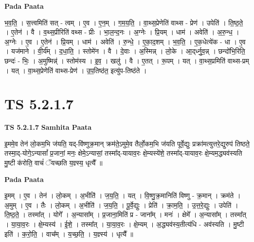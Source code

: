 \documentclass[17pt]{extarticle}
\begin{document}
\textbf{Pada Paata} \newline

भ॒व॒ति॒ । स॒त्त्वमिति॑ सत् - त्वम् । ए॒व । ए॒न॒म् । ग॒म॒य॒ति॒ । वा॒थ्स॒प्रेणेति॑ वाथ्स - प्रेण॑ । उपेति॑ । ति॒ष्ठ॒ते॒ । ए॒तेन॑ । वै । व॒थ्स॒प्रीरिति॑ वथ्स - प्रीः । भा॒ल॒न्द॒नः । अ॒ग्नेः । प्रि॒यम् । धाम॑ । अवेति॑ । अ॒रु॒न्ध॒ । अ॒ग्नेः । ए॒व । ए॒तेन॑ । प्रि॒यम् । धाम॑ । अवेति॑ । रु॒न्धे॒ । ए॒का॒द॒शम् । भ॒व॒ति॒ । ए॒क॒धेत्ये॑क - धा । ए॒व । यज॑माने । वी॒र्य᳚म् । द॒धा॒ति॒ । स्तोमे॑न । वै । दे॒वाः । अ॒स्मिन्न् । लो॒के । आ॒द्‌र्ध्नु॒व॒न्न् । छन्दो॑भि॒रिति॒ छन्दः॑ - भिः॒ । अ॒मुष्मिन्न्॑ । स्तोम॑स्य । इ॒व॒ । खलु॑ । वै । ए॒तत् । रू॒पम् । यत् । वा॒थ्स॒प्रमिति॑ वाथ्स-प्रम् । यत् । वा॒थ्स॒प्रेणेति॑ वाथ्स-प्रेण॑ । उ॒प॒तिष्ठ॑त॒ इत्यु॑प-तिष्ठ॑ते ।  \newline




\section*{ TS 5.2.1.7 }

\textbf{TS 5.2.1.7 } \newline
\textbf{Samhita Paata} \newline

इ॒ममे॒व तेन॑ लो॒कम॒भि ज॑यति॒ यद्-वि॑ष्णुक्र॒मान् क्रम॑ते॒ऽमुमे॒व तैर्लो॒कम॒भि ज॑यति पूर्वे॒द्युः प्रक्रा॑मत्युत्तरे॒द्युरुप॑ तिष्ठते॒ तस्मा॒द्-योगे॒ऽन्यासां᳚ प्र॒जानां॒ मनः॒ क्षेमे॒ऽन्यासां॒ तस्मा᳚द्-यायाव॒रः क्षे॒म्यस्ये॑शे॒ तस्मा᳚द्-यायाव॒रः क्षे॒म्यम॒द्ध्यव॑स्यति मु॒ष्टी क॑रोति॒ वाचं॑ ॅयच्छति य॒ज्ञ्स्य॒ धृत्यै᳚ ॥ \newline

\textbf{Pada Paata} \newline

इ॒मम् । ए॒व । तेन॑ । लो॒कम् । अ॒भीति॑ । ज॒य॒ति॒ । यत् । वि॒ष्णु॒क्र॒मानिति॑ विष्णु - क्र॒मान् । क्रम॑ते । अ॒मुम् । ए॒व । तैः । लो॒कम् । अ॒भीति॑ । ज॒य॒ति॒ । पू॒र्वे॒द्युः । प्रेति॑ । क्रा॒म॒ति॒ । उ॒त्त॒रे॒द्युः । उपेति॑ । ति॒ष्ठ॒ते॒ । तस्मा᳚त् । योगे᳚ । अ॒न्यासा᳚म् । प्र॒जाना॒मिति॑ प्र - जाना᳚म् । मनः॑ । क्षेमे᳚ । अ॒न्यासा᳚म् । तस्मा᳚त् । या॒या॒व॒रः । क्षे॒म्यस्य॑ । ई॒शे॒ । तस्मा᳚त् । या॒या॒व॒रः । क्षे॒म्यम् । अ॒द्ध्यव॑स्य॒तीत्य॑धि - अव॑स्यति । मु॒ष्टी इति॑ । क॒रो॒ति॒ । वाच᳚म् । य॒च्छ॒ति॒ । य॒ज्ञ्स्य॑ । धृत्यै᳚ ॥  \newline




\end{document}
